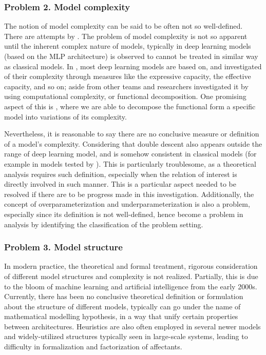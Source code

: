 \documentclass[
  journal=largetwo,
  year=2025,
  volume=37,
]{cup-journal}
\begin{document}
\subsubsection*{Problem 2. Model complexity}
The notion of model complexity can be said to be often not so well-defined. There are attempts by \cite{hu2021modelcomplexitydeeplearning,luo2024investigatingimpactmodelcomplexity,barcelo2020modelinterpretabilitylenscomputational,Molnar_2020,janik2021complexitydeepneuralnetworks}. The problem of model complexity is not so apparent until the inherent complex nature of models, typically in deep learning models (based on the MLP architecture) is observed to cannot be treated in similar way as classical models. In \cite{hu2021modelcomplexitydeeplearning}, most deep learning models are based on, and investigated of their complexity through measures like the expressive capacity, the effective capacity, and so on; aside from other teams and researchers investigated it by using computational complexity, or functional decomposition. One promising aspect of this is \cite{Molnar_2020}, where we are able to decompose the functional form a specific model into variations of its complexity. 

Nevertheless, it is reasonable to say there are no conclusive measure or definition of a model's complexity. Considering that double descent also appears outside the range of deep learning model, and is somehow consistent in classical models (for example in models tested by \cite{belkin_reconciling_2019}). This is particularly troublesome, as a theoretical analysis requires such definition, especially when the relation of interest is directly involved in such manner. This is a particular aspect needed to be resolved if there are to be progress made in this investigation. Additionally, the concept of overparameterization and underparameterization is also a problem, especially since its definition is not well-defined, hence become a problem in analysis by identifying the classification of the problem setting. 
\subsubsection*{Problem 3. Model structure}

In modern practice, the theoretical and formal treatment, rigorous consideration of different model structures and complexity is not realized. Partially, this is due to the bloom of machine learning and artificial intelligence from the early 2000s. Currently, there has been no conclusive theoretical definition or formulation about the structure of different models, typically can go under the name of mathematical modelling hypothesis, in a way that unify certain properties between architectures. Heuristics are also often employed in several newer models and widely-utilized structures typically seen in large-scale systems, leading to difficulty in formalization and factorization of affectants. 
\end{document}
